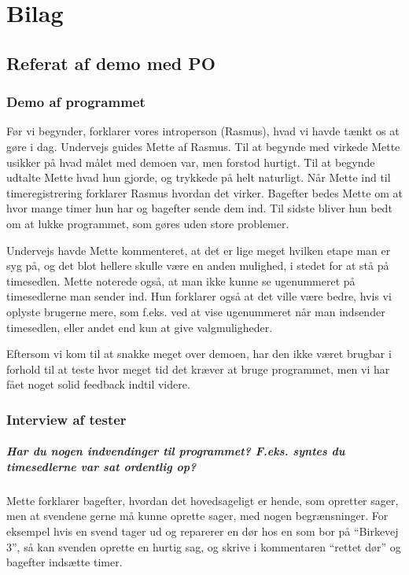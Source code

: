 
\section{Bilag}
\subsection{Referat af demo med PO}\label{demoreferat}
\subsubsection{Demo af programmet}
Før vi begynder, forklarer vores introperson (Rasmus), hvad vi havde tænkt os at gøre i dag.
Undervejs guides Mette af Rasmus.
Til at begynde med virkede Mette usikker på hvad målet med demoen var, men forstod hurtigt.
Til at begynde udtalte Mette hvad hun gjorde, og trykkede på helt naturligt.
Når Mette ind til timeregistrering forklarer Rasmus hvordan det virker. 
Bagefter bedes Mette om at hvor mange timer hun har og bagefter sende dem ind.
Til sidste bliver hun bedt om at lukke programmet, som gøres uden store problemer.

Undervejs havde Mette kommenteret, at det er lige meget hvilken etape man er syg på, og det blot hellere skulle være en anden mulighed, i stedet for at stå på timesedlen.
Mette noterede også, at man ikke kunne se ugenummeret på timesedlerne man sender ind.
Hun forklarer også at det ville være bedre, hvis vi oplyste brugerne mere, som f.eks. ved at vise ugenummeret når man indsender timesedlen, eller andet end kun at give valgmuligheder.

Eftersom vi kom til at snakke meget over demoen, har den ikke været brugbar i forhold til at teste hvor meget tid det kræver at bruge programmet, men vi har fået noget solid feedback indtil videre.

\subsubsection{Interview af tester}
\subparagraph{Har du nogen indvendinger til programmet? F.eks. syntes du timesedlerne var sat ordentlig op?}

Mette forklarer bagefter, hvordan det hovedsageligt er hende, som opretter sager, men at svendene gerne må kunne oprette sager, med nogen begrænsninger.
For eksempel hvis en svend tager ud og reparerer en dør hos en som bor på “Birkevej 3”, så kan svenden oprette en hurtig sag, og skrive i kommentaren “rettet dør” og bagefter indsætte timer.

